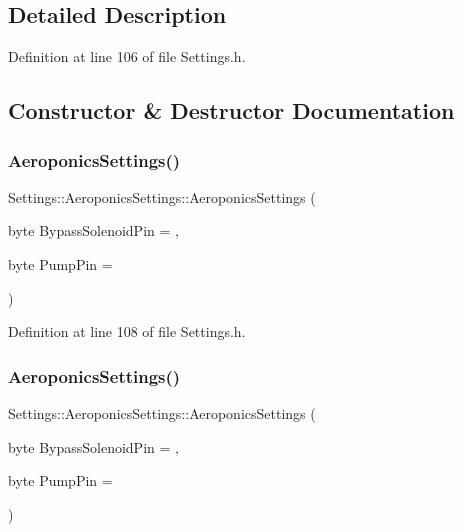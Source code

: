 \subsection{Detailed Description}


Definition at line 106 of file Settings.\+h.



\subsection{Constructor \& Destructor Documentation}
\mbox{\label{struct_settings_1_1_aeroponics_settings_af8d53957872ba4462cdd76db1f6f37f5}} 
\subsubsection{\texorpdfstring{Aeroponics\+Settings()}{AeroponicsSettings()}\hspace{0.1cm}{\footnotesize\ttfamily [1/2]}}
{\footnotesize\ttfamily Settings\+::\+Aeroponics\+Settings\+::\+Aeroponics\+Settings (\begin{DoxyParamCaption}\item[{byte}]{Bypass\+Solenoid\+Pin = {},  }\item[{byte}]{Pump\+Pin = {} }\end{DoxyParamCaption})\hspace{0.3cm}{\ttfamily [inline]}}



Definition at line 108 of file Settings.\+h.

\mbox{\label{struct_settings_1_1_aeroponics_settings_af8d53957872ba4462cdd76db1f6f37f5}} 
\subsubsection{\texorpdfstring{Aeroponics\+Settings()}{AeroponicsSettings()}\hspace{0.1cm}{\footnotesize\ttfamily [2/2]}}
{\footnotesize\ttfamily Settings\+::\+Aeroponics\+Settings\+::\+Aeroponics\+Settings (\begin{DoxyParamCaption}\item[{byte}]{Bypass\+Solenoid\+Pin = {},  }\item[{byte}]{Pump\+Pin = {} }\end{DoxyParamCaption})\hspace{0.3cm}{\ttfamily [inline]}}



